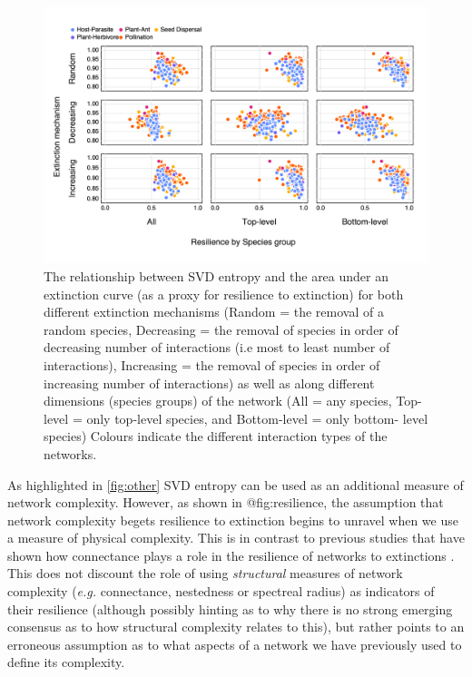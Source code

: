 \begin{figure}[h]
    \centering
    \includegraphics[width=\textwidth]{figures/entropy_v_AUCall.png}
    \caption{The relationship between SVD entropy and the area under an
extinction curve (as a proxy for resilience to extinction) for both different
extinction mechanisms (Random = the removal of a random species, Decreasing =
the removal of species in order of decreasing number of interactions (i.e most
to least number of interactions), Increasing = the removal of species in order
of increasing number of interactions) as well as along different dimensions
(species groups) of the network (All = any species, Top-level = only top-level
species, and Bottom-level = only bottom- level species) Colours indicate the
different interaction types of the networks.}
    \label{fig:resilience}
\end{figure}

As highlighted in \autoref{fig:other} SVD entropy can be used as an additional
measure of network complexity. However, as shown in @fig:resilience, the
assumption that network complexity begets resilience to extinction begins to
unravel when we use a measure of physical complexity. This is in contrast to
previous studies that have shown how connectance plays a role in the resilience
of networks to extinctions \cite{Dunne2002NetStr, Memmott2004TolPol}. This does
not discount the role of using \emph{structural} measures of network complexity
(\emph{e.g.} connectance, nestedness or spectreal radius) as indicators of their
resilience (although possibly hinting as to why there is no strong emerging
consensus as to how structural complexity relates to this), but rather points to
an erroneous assumption as to what aspects of a network we have previously used
to define its complexity.

